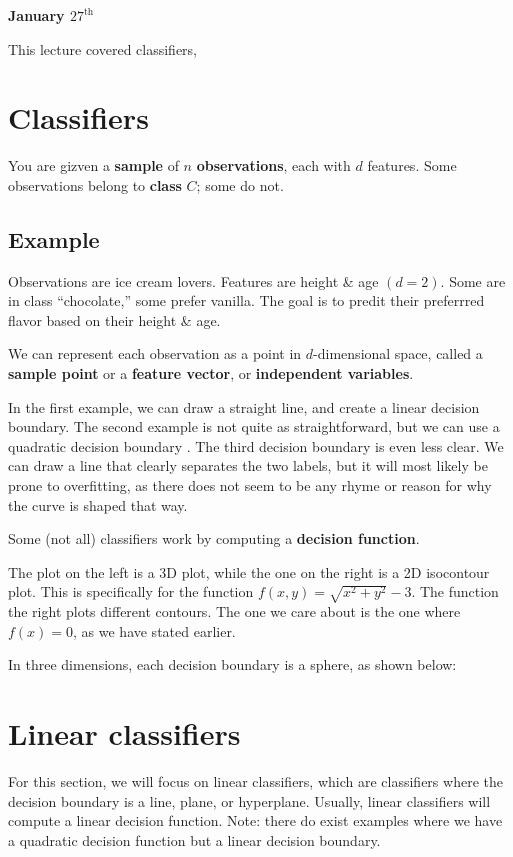 \setcounter{section}{0}

\textbf{January $27^{\text{th}}$}

This lecture covered classifiers,

\section{Classifiers}
You are gizven a \textbf{sample} of $n$ \textbf{observations}, each with $d$ features.
Some observations belong to \textbf{class} $C$;
some do not.

\subsection{Example}
Observations are ice cream lovers.
Features are height \& age $(d = 2)$.
Some are in class ``chocolate,'' some prefer vanilla.
The goal is to predit their preferrred flavor based on their height \& age.

We can represent each observation as a point in $d$-dimensional space, called a \textbf{sample point} or a \textbf{feature vector}, or \textbf{independent variables}.


In the first example, we can draw a straight line, and create a linear decision boundary.
The second example is not quite as straightforward, but we can use a quadratic decision boundary .
The third decision boundary is even less clear.
We can draw a line that clearly separates the two labels, but it will most likely be prone to overfitting, as there does not seem to be any rhyme or reason for why the curve is shaped that way.

Some (not all) classifiers work by computing a \textbf{decision function}.




The plot on the left is a 3D plot, while the one on the right is a 2D isocontour plot.
This is specifically for the function $f(x, y) = \sqrt{x^2+ y^2} - 3$.
The function the right plots different contours.
The one we care about is the one where $f(x) = 0$, as we have stated earlier.

In three dimensions, each decision boundary is a sphere, as shown below:


\section{Linear classifiers}
For this section, we will focus on linear classifiers, which are classifiers where the decision boundary is a line, plane, or hyperplane.
Usually, linear classifiers will compute a linear decision function.
Note: there do exist examples where we have a quadratic decision function but a linear decision boundary.


